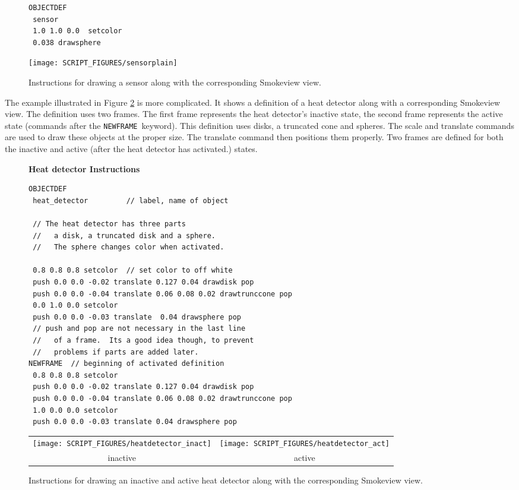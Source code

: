 \documentclass[11pt,twoside]{book}
\begin{document}
\begin{figure}[\figoptions]
{\small
\begin{lstlisting}[frame=single,rulecolor=\color{yellow},
framerule=1pt,framesep=1pc,fillcolor=\color{yellow}]
OBJECTDEF
 sensor
 1.0 1.0 0.0  setcolor
 0.038 drawsphere
\end{lstlisting}
}
\begin{center}
\texttt{[image: SCRIPT\_FIGURES/sensorplain]}\\
\end{center}
\caption{Instructions for drawing a sensor along with the corresponding Smokeview view.}
\label{figsensor}%
\end{figure}

The example illustrated in Figure \ref{figsprinkler} is more complicated. It shows a definition of a heat detector along with a corresponding
Smokeview view. The definition uses two frames. The first frame represents the heat detector's inactive state, the second frame represents the active state (commands after the {\tt NEWFRAME}\ keyword). This definition uses disks, a truncated cone and spheres. The scale and translate commands are used to draw these objects at the proper size. The translate command then positions them properly.  Two frames are defined for both the inactive and active (after the heat detector has activated.) states.

\begin{figure}[\figoptions]
{\bf Heat detector Instructions}\\
{\small
\begin{lstlisting}[frame=single,rulecolor=\color{yellow},
framerule=1pt,framesep=1pc,fillcolor=\color{yellow}]
OBJECTDEF
 heat_detector         // label, name of object

 // The heat detector has three parts
 //   a disk, a truncated disk and a sphere.
 //   The sphere changes color when activated.

 0.8 0.8 0.8 setcolor  // set color to off white
 push 0.0 0.0 -0.02 translate 0.127 0.04 drawdisk pop
 push 0.0 0.0 -0.04 translate 0.06 0.08 0.02 drawtrunccone pop
 0.0 1.0 0.0 setcolor
 push 0.0 0.0 -0.03 translate  0.04 drawsphere pop
 // push and pop are not necessary in the last line
 //   of a frame.  Its a good idea though, to prevent
 //   problems if parts are added later.
NEWFRAME  // beginning of activated definition
 0.8 0.8 0.8 setcolor
 push 0.0 0.0 -0.02 translate 0.127 0.04 drawdisk pop
 push 0.0 0.0 -0.04 translate 0.06 0.08 0.02 drawtrunccone pop
 1.0 0.0 0.0 setcolor
 push 0.0 0.0 -0.03 translate 0.04 drawsphere pop
\end{lstlisting}
}
\begin{center}
\begin{tabular}{cc}
 \texttt{[image: SCRIPT\_FIGURES/heatdetector\_inact]}&
 \texttt{[image: SCRIPT\_FIGURES/heatdetector\_act]}\\
inactive&active\\
 \end{tabular}
 \end{center}
\caption{Instructions for drawing an inactive and active heat detector
along with the corresponding Smokeview view.}
\label{figsprinkler}%
\end{figure}
\end{document}
